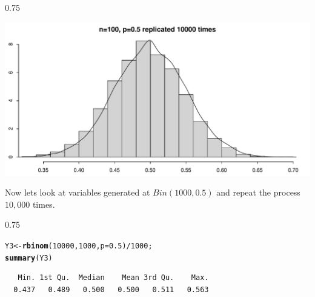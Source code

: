\documentclass{beamer}\usepackage[]{graphicx}\usepackage[]{color}
\makeatletter
\newcommand{\hlnum}[1]{\textcolor[rgb]{0.2,0.2,0.2}{#1}}%
\newcommand{\hlopt}[1]{\textcolor[rgb]{0.102,0.102,0.102}{#1}}%
\newcommand{\hlstd}[1]{\textcolor[rgb]{0.102,0.102,0.102}{#1}}%
\newcommand{\hlkwb}[1]{\textcolor[rgb]{0.102,0.102,0.102}{#1}}%
\newcommand{\hlkwc}[1]{\textcolor[rgb]{0.2,0.2,0.2}{#1}}%
\newcommand{\hlkwd}[1]{\textcolor[rgb]{0.102,0.102,0.102}{\textbf{#1}}}%
\newenvironment{kframe}{%
 \def\at@end@of@kframe{}%
 \ifinner\ifhmode%
  \def\at@end@of@kframe{\end{minipage}}%
  \begin{minipage}{\columnwidth}%
 \fi\fi%
 \def\FrameCommand##1{\hskip\@totalleftmargin \hskip-\fboxsep
 \colorbox{shadecolor}{##1}\hskip-\fboxsep
     \hskip-\linewidth \hskip-\@totalleftmargin \hskip\columnwidth}%
 \MakeFramed {\advance\hsize-\width
   \@totalleftmargin\z@ \linewidth\hsize
   \@setminipage}}%
 {\par\unskip\endMakeFramed%
 \at@end@of@kframe}
\newenvironment{knitrout}{}{} %
\renewenvironment{knitrout}{\begin{spacing}{0.75}\begin{tiny}}{\end{tiny}\end{spacing}}
\makeatother
\begin{document}
\begin{frame}[fragile]

\begin{knitrout}\small
{}\color{fgcolor}

{\centering \includegraphics[width=0.89\linewidth]{figure/graphics-unnamed-chunk-17-1} 

}



\end{knitrout}

\end{frame}

\begin{frame}[fragile]

Now lets look at variables generated at $Bin(1000,0.5)$ and repeat the process $10,000$ times.

\begin{knitrout}\small
{}\color{fgcolor}\begin{kframe}
\begin{alltt}
\hlstd{Y3} \hlkwb{<-} \hlkwd{rbinom}\hlstd{(}\hlnum{10000}\hlstd{,} \hlnum{1000}\hlstd{,} \hlkwc{p}\hlstd{=}\hlnum{0.5}\hlstd{)}\hlopt{/} \hlnum{1000}\hlstd{;}
\hlkwd{summary}\hlstd{(Y3)}
\end{alltt}
\begin{verbatim}
   Min. 1st Qu.  Median    Mean 3rd Qu.    Max. 
  0.437   0.489   0.500   0.500   0.511   0.563 
\end{verbatim}
\end{kframe}
\end{knitrout}

\end{frame}
\end{document}
